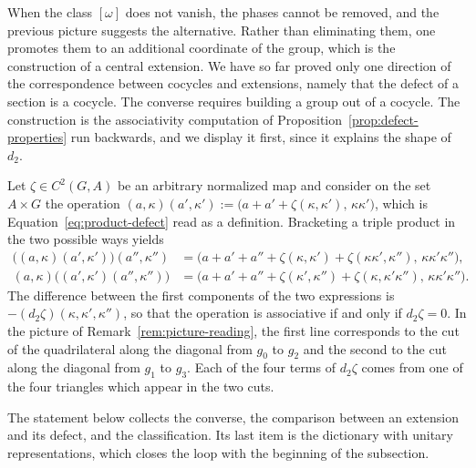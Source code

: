 When the class $[\omega]$ does not vanish, the phases cannot be removed, and the previous picture suggests the alternative. Rather than eliminating them, one promotes them to an additional coordinate of the group, which is the construction of a central extension. We have so far proved only one direction of the correspondence between cocycles and extensions, namely that the defect of a section is a cocycle. The converse requires building a group out of a cocycle. The construction is the associativity computation of Proposition~\ref{prop:defect-properties} run backwards, and we display it first, since it explains the shape of $d_2$.

\begin{remark}\label{rem:associator}
	Let $\zeta\in C^2(G,A)$ be an arbitrary normalized map and consider on the set $A\times G$ the operation $(a,\kappa)(a',\kappa'):=\big(a+a'+\zeta(\kappa,\kappa'),\,\kappa\kappa'\big)$, which is Equation~\eqref{eq:product-defect} read as a definition. Bracketing a triple product in the two possible ways yields
	\begin{align*}
		\big((a,\kappa)(a',\kappa')\big)(a'',\kappa'')&=\big(a+a'+a''+\zeta(\kappa,\kappa')+\zeta(\kappa\kappa',\kappa''),\,\kappa\kappa'\kappa''\big),\\
		(a,\kappa)\big((a',\kappa')(a'',\kappa'')\big)&=\big(a+a'+a''+\zeta(\kappa',\kappa'')+\zeta(\kappa,\kappa'\kappa''),\,\kappa\kappa'\kappa''\big).
	\end{align*}
	The difference between the first components of the two expressions is $-(d_2\zeta)(\kappa,\kappa',\kappa'')$, so that the operation is associative if and only if $d_2\zeta=0$. In the picture of Remark~\ref{rem:picture-reading}, the first line corresponds to the cut of the quadrilateral along the diagonal from $g_0$ to $g_2$ and the second to the cut along the diagonal from $g_1$ to $g_3$. Each of the four terms of $d_2\zeta$ comes from one of the four triangles which appear in the two cuts.
\end{remark}

The statement below collects the converse, the comparison between an extension and its defect, and the classification. Its last item is the dictionary with unitary representations, which closes the loop with the beginning of the subsection.

